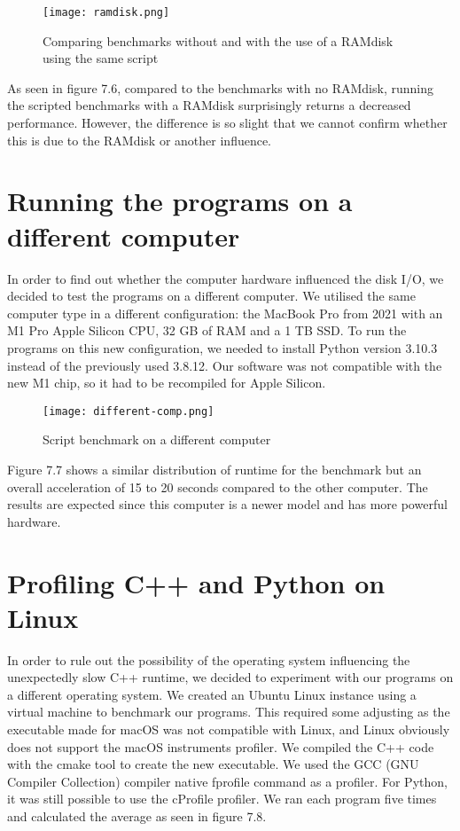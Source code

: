 \begin{figure}[H]
	\centering
	\texttt{[image: ramdisk.png]}
	\caption{Comparing benchmarks without and with the use of a RAMdisk using the same script}
	\label{figure:ramdisk}
\end{figure}

As seen in figure 7.6, compared to the benchmarks with no RAMdisk, running the scripted benchmarks with a RAMdisk surprisingly returns a decreased performance. However, the difference is so slight that we cannot confirm whether this is due to the RAMdisk or another influence.

\section{Running the programs on a different computer}
In order to find out whether the computer hardware influenced the disk I/O, we decided to test the programs on a different computer. We utilised the same computer type in a different configuration: the MacBook Pro from 2021 with an M1 Pro Apple Silicon CPU, 32 GB of RAM and a 1 TB SSD. To run the programs on this new configuration, we needed to install Python version 3.10.3 instead of the previously used 3.8.12. Our software was not compatible with the new M1 chip, so it had to be recompiled for Apple Silicon.

\begin{figure}[H]
	\centering
	\texttt{[image: different-comp.png]}
	\caption{Script benchmark on a different computer}
	\label{figure:different-comp}
\end{figure}

Figure 7.7 shows a similar distribution of runtime for the benchmark but an overall acceleration of 15 to 20 seconds compared to the other computer. The results are expected since this computer is a newer model and has more powerful hardware.

\section{Profiling C++ and Python on Linux}
In order to rule out the possibility of the operating system influencing the unexpectedly slow C++ runtime, we decided to experiment with our programs on a different operating system. We created an Ubuntu Linux instance using a virtual machine to benchmark our programs. This required some adjusting as the executable made for macOS was not compatible with Linux, and Linux obviously does not support the macOS instruments profiler. We compiled the C++ code with the cmake tool to create the new executable. We used the GCC (GNU Compiler Collection) compiler native fprofile command as a profiler. For Python, it was still possible to use the cProfile profiler. We ran each program five times and calculated the average as seen in figure 7.8.

